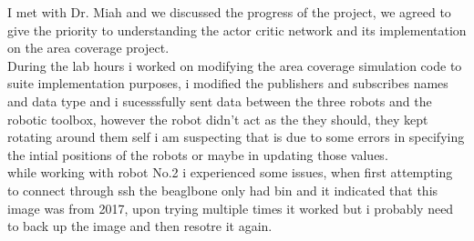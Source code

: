 \documentclass[fontsize=11pt, %
                             paper=letter, %
                             twoside, %
                             captions=tableheading,
                             index=totoc,
                             hyperref]{labbook}
\begin{document}
I met with Dr. Miah and we discussed the progress of the project, we agreed to give the priority to understanding the actor critic network and its implementation on the area coverage project. 
\\ During the lab hours i worked on modifying the area coverage simulation code to suite implementation purposes, i modified the publishers and subscribes names and data type and i sucesssfully sent data between the three robots and the robotic toolbox, however the robot didn't act as the they should, they kept rotating around them self i am suspecting that is due to some errors in specifying the intial positions of the robots or maybe in updating those values. 
\\while working with robot No.2 i experienced some issues, when first attempting to connect through ssh the beaglbone only had bin and it indicated that this image was from 2017, upon trying multiple times it worked but i probably need to back up the image and then resotre it again. 










\end{document}
